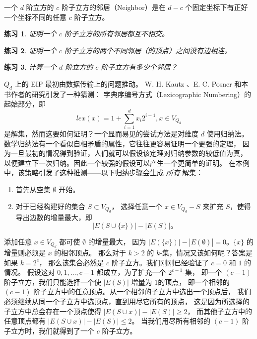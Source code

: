 \documentclass[12pt, a4paper]{article}
\newtheorem{exercise}{练习}
\begin{document}
一个 $d$ 阶立方的 $c$ 阶子立方的邻居（Neighbor）是在 $d − c$
个固定坐标下有正好一个坐标不同的任意 $c$ 阶子立方。

\begin{exercise}
\label{Exercise 5}
证明一个 $c$ 阶子立方的所有邻居都互不相交。
\end{exercise}

\begin{exercise}
\label{Exercise 6}
证明一个 $c$ 阶子立方的两个不同邻居（的顶点）之间没有边相连。
\end{exercise}

\begin{exercise}
\label{Exercise 7}
计算一个 $d$ 阶立方的 $c$ 阶子立方有多少个邻居？
\end{exercise}

$Q_d$ 上的 EIP 最初由数据传输上的问题推动。
W. H. Kautz \cite{Kautz}、E. C. Posner 和本书作者的研究引发了一种猜测：
字典序编号方式（Lexicographic Numbering）的起始部分，即
$$lex(x) = 1 + \sum_{i = 1}^dx_i2^{i - 1}, x \in V_{Q_d}$$
是解集，然而这要如何证明？一个显而易见的尝试方法是对维度 $d$ 使用归纳法。
数学归纳法有一个看似自相矛盾的属性，它往往更容易证明一个更强的定理，
因为一旦最初的情况得到验证，人们就可以假设该定理对归纳参数的较低值为真，
以便建立下一次归纳。因此一个较强的假设可以产生一个更简单的证明。
在本例中，该策略引发了这种推测——以下归纳步骤会生成 \emph{所有} 解集：

\begin{enumerate}[(1)]
	\item 首先从空集 $\emptyset$ 开始。
	\item 对于已经构建好的集合 $S \subset V_{Q_d}$，
		选择任意一个 $x \in V_{Q_d} − S$ 来扩充 $S$，使得导出边数的增量最大，即
		$$|E(S \cup \{x\})| − |E(S)|。$$
\end{enumerate}

添加任意 $x \in V_{Q_d}$ 都可使 $\emptyset$ 的增量最大，
因为 $|E(\{x\})| − |E(\emptyset)| = 0$。$\{x\}$ 的增量则必须是 $x$ 的相邻顶点。
那么对于 $k > 2$ 的 $k$-集，情况又该如何呢？答案是如果 $k = 2^c$，
那么该集合必然是 $c$ 阶子立方。我们刚刚已经验证了 $c = 0$ 和 $1$ 的情况。
假设这对 $0, 1, \dots, c − 1$ 都成立，为了扩充一个 $2^{c−1}$-集，
即一个 $(c − 1)$ 阶子立方，我们只能选择一个使 $|E(S)|$ 增量为 $1 $的顶点，
即一个相邻的 $(c − 1)$ 阶子立方中的任意顶点。从一个相邻的子立方中选出一个顶点后，
我们必须继续从同一个子立方中选顶点，直到用尽它所有的顶点，
这是因为所选择的子立方中总会存在一个顶点使得 $|E(S \cup {x})| − |E(S)| \ge 2$，
而其他子立方中的任意顶点都有 $|E(S \cup {x})| − |E(S)| \le 2$。
当我们用尽所有相邻的 $(c − 1)$ 阶子立方时，我们就得到了一个 $c$ 阶子立方。
\end{document}
